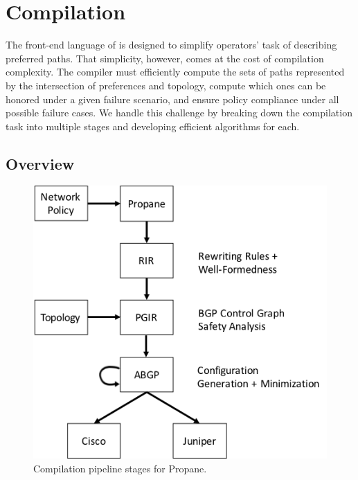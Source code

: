 \section{Compilation}
\label{sec:compilation}

The front-end language of \sysname is designed to simplify operators' task of describing preferred paths. That simplicity, however, comes at the cost of compilation complexity. The compiler must efficiently compute the sets of paths represented by the intersection of preferences and topology, compute which ones can be honored under a given failure scenario, and ensure policy compliance under all possible failure cases. We handle this challenge by breaking down the compilation task into multiple stages and developing efficient algorithms for each.

\subsection{Overview}

\begin{figure}[t!]
\centering
\includegraphics[width=\columnwidth]{figures/pipeline}
\caption{Compilation pipeline stages for Propane.}
\label{fig:pipeline}
\end{figure}


